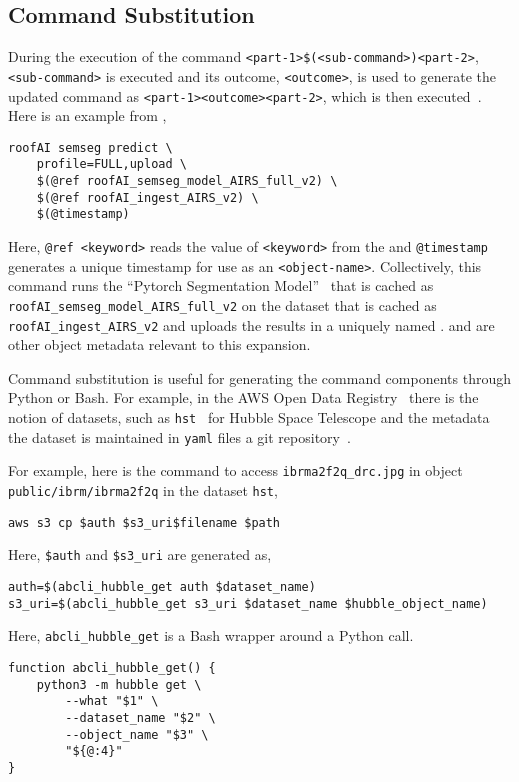 \subsection{Command Substitution}
\label{command_substitution}

During the execution of the command \texttt{<part-1>\$(<sub-command>)<part-2>}, \texttt{<sub-command>} is executed and its outcome, \texttt{<outcome>}, is used to generate the updated command as \texttt{<part-1><outcome><part-2>}, which is then executed~. Here is an example from ,
%
\begin{verbatim}
roofAI semseg predict \
    profile=FULL,upload \
    $(@ref roofAI_semseg_model_AIRS_full_v2) \
    $(@ref roofAI_ingest_AIRS_v2) \
    $(@timestamp)
\end{verbatim}
%
Here, \texttt{@ref <keyword>} reads the value of \texttt{<keyword>} from the  and \texttt{@timestamp} generates a unique timestamp for use as an \texttt{<object-name>}. Collectively, this command runs the \enquote{Pytorch Segmentation Model}~ that is cached as \texttt{roofAI\_semseg\_model\_AIRS\_full\_v2} on the dataset that is cached as \texttt{roofAI\_ingest\_AIRS\_v2} and uploads the results in a uniquely named .  and  are other object metadata relevant to this expansion.

Command substitution is useful for generating the command components through Python or Bash. For example, in the AWS Open Data Registry~ there is the notion of datasets, such as \texttt{hst}~ for Hubble Space Telescope and the metadata the dataset is maintained in \texttt{yaml} files a git repository~. 

For example, here is the command to access \texttt{ibrma2f2q\_drc.jpg} in object \texttt{public/ibrm/ibrma2f2q} in the dataset \texttt{hst},
%
\begin{verbatim}
aws s3 cp $auth $s3_uri$filename $path
\end{verbatim}
%
Here, \texttt{\$auth} and \texttt{\$s3\_uri} are generated as,
%
\begin{verbatim}
auth=$(abcli_hubble_get auth $dataset_name)
s3_uri=$(abcli_hubble_get s3_uri $dataset_name $hubble_object_name)
\end{verbatim}
%
Here, \texttt{abcli\_hubble\_get} is a Bash wrapper around a Python call.
%
\begin{verbatim}
function abcli_hubble_get() {
    python3 -m hubble get \
        --what "$1" \
        --dataset_name "$2" \
        --object_name "$3" \
        "${@:4}"
}
\end{verbatim}




